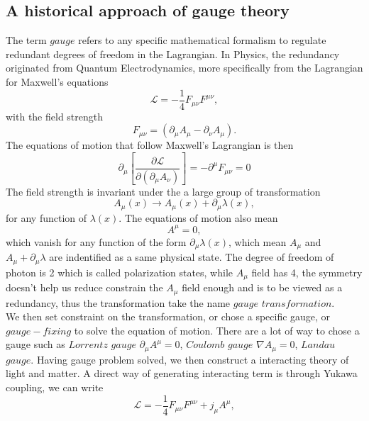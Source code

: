 \documentclass{report}
\numberwithin{equation}{section}
\begin{document}
\subsection{A historical approach of gauge theory}
The term $gauge$ refers to any specific mathematical formalism to regulate redundant degrees of freedom in the Lagrangian. In Physics, the redundancy originated from Quantum Electrodynamics, more specifically from the Lagrangian for Maxwell’s equations
\begin{equation}
\mathcal{L}=-\frac{1}{4} F_{\mu \nu}F^{\mu \nu},
\end{equation}
with the field strength
\begin{equation}
F_{\mu \nu}=(\partial_\mu A_\mu-\partial_\nu A_\mu).
\end{equation}
The equations of motion that follow Maxwell's Lagrangian is then
\begin{equation}
    \partial_\mu\left[ \frac{\partial \mathcal{L}}{\partial(\partial_\mu A_\nu)}\right]=-\partial^\mu F_{\mu \nu}=0
\end{equation}
The field strength is invariant under the a large group of transformation
\begin{equation}
A_\mu(x)\rightarrow A_\mu(x) +\partial_\mu \lambda(x),
\end{equation}
for any function of $\lambda(x)$.
The equations of motion also mean
\begin{equation}
    [\eta_{\mu\nu}(\partial^\rho \partial_\rho)-\partial_\mu \partial_\nu]A^\mu=0,
\end{equation}
which vanish for any function of the form $\partial_\mu \lambda(x)$, which mean $A_\mu$ and $A_\mu +\partial_\mu \lambda$ are indentified as a same physical state. The degree of freedom of photon is 2 which is called polarization states, while $A_\mu$ field has 4, the symmetry doesn't help us reduce constrain the $A_\mu$ field enough and is to be viewed as a redundancy, thus the transformation take the name $gauge$ $transformation$.\\
We then set constraint on the transformation, or chose a specific gauge, or $gauge-fixing$ to solve the equation of motion. There are a lot of way to chose a gauge such as $Lorrentz$ $gauge$ $\partial_\mu A^\mu=0$, $Coulomb$ $gauge$ $\nabla A_\mu=0$, $Landau$ $gauge$.
Having gauge problem solved, we then construct a interacting theory of light and matter. A direct way of generating interacting term is through Yukawa coupling, we can write 
\begin{equation}
    \mathcal{L}=-\frac{1}{4}F_{\mu\nu}F^{\mu\nu}+ j_\mu A^\mu,
\end{equation}
\end{document}
